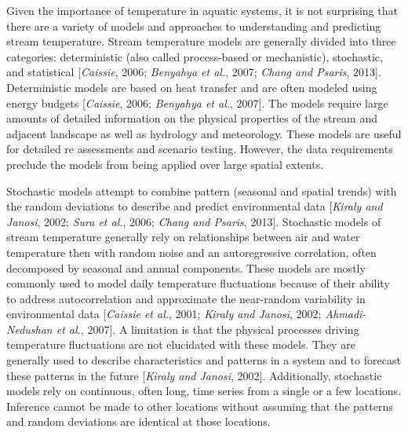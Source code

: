 Given the importance of temperature in aquatic systems, it is not
surprising that there are a variety of models and approaches to
understanding and predicting stream temperature. Stream temperature
models are generally divided into three categories: deterministic (also
called process-based or mechanistic), stochastic, and statistical
{[}\emph{Caissie}, 2006; \emph{Benyahya et al.}, 2007; \emph{Chang and
Psaris}, 2013{]}. Deterministic models are based on heat transfer and
are often modeled using energy budgets {[}\emph{Caissie}, 2006;
\emph{Benyahya et al.}, 2007{]}. The models require large amounts of
detailed information on the physical properties of the stream and
adjacent landscape as well as hydrology and meteorology. These models
are useful for detailed re assessments and scenario testing. However,
the data requirements preclude the models from being applied over large
spatial extents.

Stochastic models attempt to combine pattern (seasonal and spatial
trends) with the random deviations to describe and predict environmental
data {[}\emph{Kiraly and Janosi}, 2002; \emph{Sura et al.}, 2006;
\emph{Chang and Psaris}, 2013{]}. Stochastic models of stream
temperature generally rely on relationships between air and water
temperature then with random noise and an autoregressive correlation,
often decomposed by seasonal and annual components. These models are
mostly commonly used to model daily temperature fluctuations because of
their ability to address autocorrelation and approximate the near-random
variability in environmental data {[}\emph{Caissie et al.}, 2001;
\emph{Kiraly and Janosi}, 2002; \emph{Ahmadi-Nedushan et al.}, 2007{]}.
A limitation is that the physical processes driving temperature
fluctuations are not elucidated with these models. They are generally
used to describe characteristics and patterns in a system and to
forecast these patterns in the future {[}\emph{Kiraly and Janosi},
2002{]}. Additionally, stochastic models rely on continuous, often long,
time series from a single or a few locations. Inference cannot be made
to other locations without assuming that the patterns and random
deviations are identical at those locations.

